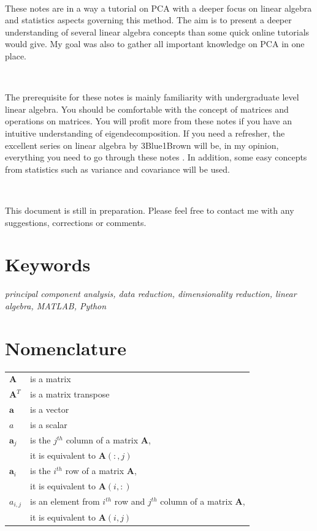\documentclass[10pt,twocolumn]{article}
\begin{document}
\,\,

These notes are in a way a tutorial on PCA with a deeper focus on linear algebra and statistics aspects governing this method. The aim is to present a deeper understanding of several linear algebra concepts than some quick online tutorials would give. My goal was also to gather all important knowledge on PCA in one place. 

\,\,

The prerequisite for these notes is mainly familiarity with undergraduate level linear algebra. You should be comfortable with the concept of matrices and operations on matrices. You will profit more from these notes if you have an intuitive understanding of eigendecomposition. If you need a refresher, the excellent series on linear algebra by 3Blue1Brown will be, in my opinion, everything you need to go through these notes \cite{3Blue1Brown}. In addition, some easy concepts from statistics such as variance and covariance will be used.

\,\,

This document is still in preparation. Please feel free to contact me with any suggestions, corrections or comments.

\section*{Keywords}

\textit{principal component analysis, data reduction, dimensionality reduction, linear algebra, MATLAB\textregistered, Python}

\tableofcontents

\section{Nomenclature}

\begin{tabular}{ll}
    $\bm{A}$ & is a matrix \\
     $\bm{A}^T$ & is a matrix transpose \\
     $\bm{a}$ & is a vector \\
     $a$ & is a scalar \\
    $\bm{a}_j$ & is the $j^{th}$ column of a matrix $\bm{A}$, \\
    & it is equivalent to  $\bm{A}(:,j)$ \\
    $\bm{a}_i$ & is the $i^{th}$ row of a matrix $\bm{A}$, \\
    & it is equivalent to  $\bm{A}(i,:)$ \\
    $a_{i,j}$ & is an element from $i^{th}$ row and $j^{th}$ column of a matrix $\bm{A}$, \\ 
    & it is equivalent to  $\bm{A}(i,j)$ \\
\end{tabular}
\end{document}
